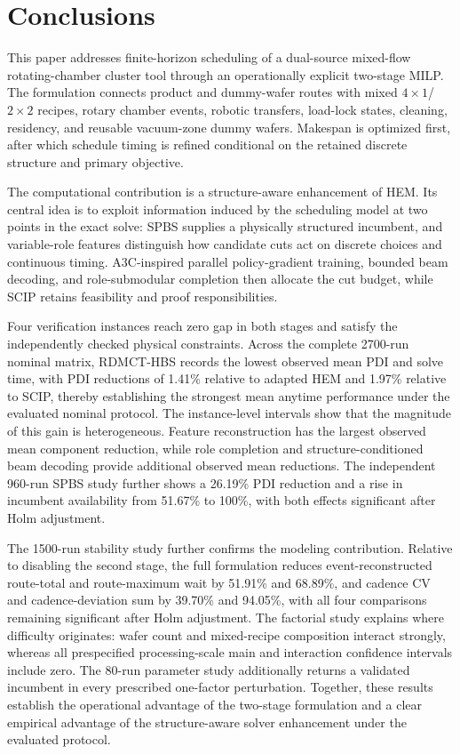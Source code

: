 \documentclass[preprint,12pt,authoryear]{elsarticle}
\begin{document}
\section{Conclusions}
\label{sec:conclusion}

This paper addresses finite-horizon scheduling of a dual-source mixed-flow
rotating-chamber cluster tool through an operationally explicit two-stage MILP. The
formulation connects product and dummy-wafer routes with mixed
$4\times1$/$2\times2$ recipes, rotary chamber events, robotic transfers,
load-lock states, cleaning, residency, and reusable vacuum-zone dummy wafers. Makespan
is optimized first, after which schedule timing is refined conditional on the
retained discrete structure and primary objective.

The computational contribution is a structure-aware enhancement of HEM. Its
central idea is to exploit information induced by the scheduling model at two
points in the exact solve: SPBS supplies a physically structured incumbent,
and variable-role features distinguish how candidate cuts act on discrete
choices and continuous timing. A3C-inspired parallel policy-gradient
training, bounded beam decoding, and role-submodular completion then allocate
the cut budget, while SCIP retains feasibility and proof responsibilities.

Four verification instances reach zero gap in both stages and satisfy the
independently checked physical constraints. Across the complete 2700-run
nominal matrix, RDMCT-HBS records the lowest observed mean PDI and solve
time, with PDI reductions of 1.41\% relative to adapted HEM and 1.97\%
relative to SCIP, thereby establishing the strongest mean anytime performance
under the evaluated nominal protocol. The instance-level intervals show that
the magnitude of this gain is heterogeneous. Feature reconstruction has the
largest observed mean component reduction, while role completion and
structure-conditioned beam decoding provide additional observed mean
reductions. The independent 960-run SPBS study further shows a 26.19\% PDI
reduction and a rise in incumbent availability from 51.67\% to 100\%, with
both effects significant after Holm adjustment.

The 1500-run stability study further confirms the modeling contribution.
Relative to disabling the second stage, the full formulation reduces
event-reconstructed route-total and route-maximum wait by 51.91\% and 68.89\%,
and cadence CV and cadence-deviation sum by 39.70\% and 94.05\%, with all four
comparisons remaining significant after Holm adjustment. The factorial study
explains where difficulty originates: wafer
count and mixed-recipe composition interact strongly, whereas all prespecified
processing-scale main and interaction confidence intervals
include zero. The 80-run parameter study additionally returns a validated
incumbent in every prescribed one-factor perturbation. Together, these results
establish the operational advantage of the two-stage formulation and a clear
empirical advantage of the structure-aware solver enhancement under the
evaluated protocol.
\end{document}
